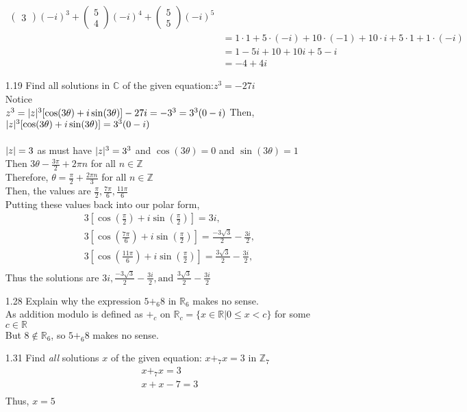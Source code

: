 \documentclass[12pt]{article}
\newcommand{\Z}{\mathds{Z}}
\newcommand{\C}{\mathbb{C}}
\newcommand{\R}{\mathbb{R}}
\DeclarePairedDelimiter\abs{\lvert}{\rvert}
\begin{document}
\begin{enumerate}
\begin{align*}
\begin{pmatrix}
				3
				\end{pmatrix} (-i)^3 + 
				\begin{pmatrix}
				5\\
				4
				\end{pmatrix} (-i)^4 + 
				\begin{pmatrix}
				5\\
				5
				\end{pmatrix} (-i)^5 \\
			&= 1\cdot 1 + 5 \cdot (-i) + 10 \cdot (-1)+10\cdot i + 5 \cdot 1 + 1 \cdot (-i)\\
			&= 1-5i+10+10i+5-i\\
			&= -4+4i		
		\end{align*}
	\item[1.19] Find all solutions in $\C$ of the given equation:\quad $z^3 = -27i$\\
		Notice \\
		$z^3 = \abs{z}^3[\cos(3\theta)+i\sin(3\theta)]\\
		-27i = -3^3 = 3^3(0-i) \\
		$
		Then,\\
		$\abs{z}^3[\cos(3\theta)+i\sin(3\theta)] = 3^3(0-i)$\\
		\\
		$\abs{z}=3$ as must have $\abs{z}^3 = 3^3$ and $\cos(3\theta)=0$ and $\sin(3\theta)=1$\\
		Then $3\theta - \frac{3\pi}{2}+2\pi n$ for all $n\in \Z$\\
		Therefore, $\theta = \frac{\pi}{2}+\frac{2\pi n}{3}$ for all $n \in \Z$\\
		Then, the values are $\frac{\pi}{2},\frac{7\pi}{6},\frac{11\pi}{6}$\\
		Putting these values back into our polar form,
		\begin{align*}
			3[\cos(\frac{\pi}{2})+i\sin(\frac{\pi}{2})]=3i,\\
			3[\cos(\frac{7\pi}{6})+i\sin(\frac{\pi}{2})]=\frac{-3\sqrt{3}}{2}-\frac{3i}{2},\\
			3[\cos(\frac{11\pi}{6})+i\sin(\frac{\pi}{2})]=\frac{3\sqrt{3}}{2}-\frac{3i}{2},\\
		\end{align*}
		Thus the solutions are $3i,\frac{-3\sqrt{3}}{2}-\frac{3i}{2},\text{and }\frac{3\sqrt{3}}{2}-\frac{3i}{2}$
	\item[1.28] Explain why the expression $5+_6 8$ in $\R_6$ makes no sense.\\
	As addition modulo is defined as $+_c$ on $\R_c = \{x\in \R | 0 \leq x < c \}$ for some $c \in \R$\\
	But $8 \notin \R_6$, so $5+_6 8$ makes no sense. 
	\item[1.31] Find \textit{all} solutions $x$ of the given equation: \quad $x+_7x=3$ in $\Z_7$\\
		\begin{align*}
			x+_7x=3\\
			x+x-7=3\\
		\end{align*}
		Thus, $x=5$
	

\end{enumerate}
\end{document}
